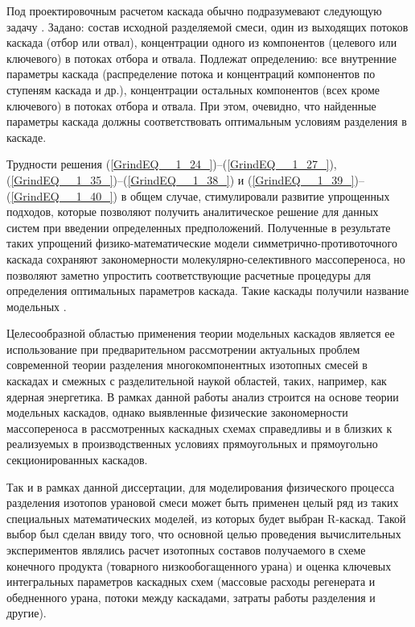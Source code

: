Под проектировочным расчетом каскада обычно подразумевают следующую задачу \cite{sulaberidzeTeoriyaKaskadovDlya2011}.
Задано: состав исходной разделяемой смеси, один из выходящих потоков каскада (отбор или отвал), концентрации одного из компонентов (целевого или ключевого) в потоках отбора и отвала.
Подлежат определению: все внутренние параметры каскада (распределение потока и концентраций компонентов по ступеням каскада и др.), концентрации остальных компонентов (всех кроме ключевого) в потоках отбора и отвала. 
При этом, очевидно, что найденные параметры каскада должны соответствовать оптимальным условиям разделения в каскаде.

Трудности решения (\ref{GrindEQ__1_24_})--(\ref{GrindEQ__1_27_}), (\ref{GrindEQ__1_35_})--(\ref{GrindEQ__1_38_}) и (\ref{GrindEQ__1_39_})--(\ref{GrindEQ__1_40_}) в общем случае, стимулировали развитие упрощенных подходов, которые позволяют получить аналитическое решение для данных систем при введении определенных предположений. Полученные в результате таких упрощений физико-математические модели симметрично-противоточного каскада сохраняют закономерности молекулярно-селективного массопереноса, но позволяют заметно упростить соответствующие расчетные процедуры для определения оптимальных параметров каскада. Такие каскады получили название модельных \cite{minenkoTeoriiKaskadovDlya1965, delagarzaMulticomponentIsotopeSeparation1961, zhigalovskiyLekcionnyeMaterialyPo1999, kolokoltsovDesignCascadesSeparating1970, kolokolcovVoprosuPostroeniiKaskadov1970, minenkoPredelnoeObogashcheniePromezhutochnyh1972, yamamotoMulticomponentIsotopeSeparating1978, wuStudyMulticomponentIsotope, borisevichRascheteKaskadovDopolnitelnym1993, woodCriterionEffiencyMultiisotope1999, sulaberidzeOsobennostiObogashcheniyaKomponentov2006, sazykinKvaziidealnyeKaskadyDlya2000, sulaberidzeSravnenieOptimalnyhModelnyh2008}.

Целесообразной областью применения теории модельных каскадов является ее использование при предварительном рассмотрении актуальных проблем современной теории разделения многокомпонентных изотопных смесей в каскадах и смежных с разделительной наукой областей, таких, например, как ядерная энергетика. В рамках данной работы анализ строится на основе теории модельных каскадов, однако выявленные физические закономерности массопереноса в рассмотренных каскадных схемах справедливы и в близких к реализуемых в производственных условиях прямоугольных и прямоугольно секционированных каскадов.

Так и в рамках данной диссертации, для моделирования физического процесса разделения изотопов урановой смеси может быть применен целый ряд из таких специальных математических моделей, из которых будет выбран R-каскад. Такой выбор был сделан ввиду того, что основной целью проведения вычислительных экспериментов являлись расчет изотопных составов получаемого в схеме конечного продукта (товарного низкообогащенного урана) и оценка ключевых интегральных параметров каскадных схем (массовые расходы регенерата и обедненного урана, потоки между каскадами, затраты работы разделения и другие). 

